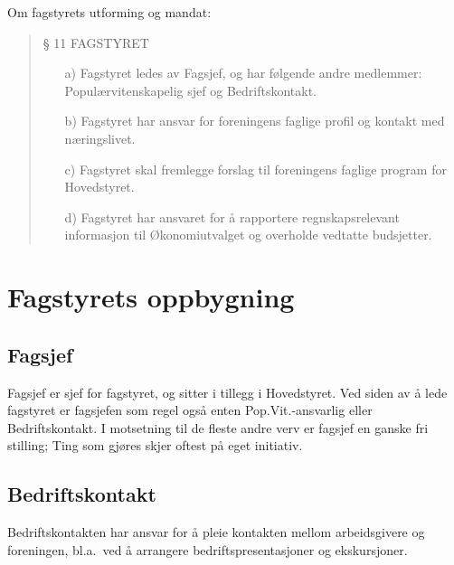 %
Om fagstyrets utforming og mandat:
\begin{quote}

    {\Large § 11 FAGSTYRET}
    
    \begin{itemize}
        \item[a)] Fagstyret ledes av Fagsjef, og har følgende andre medlemmer:
        Populærvitenskapelig sjef og Bedriftskontakt.
        
        \item[b)] Fagstyret har ansvar for foreningens faglige profil og
        kontakt med næringslivet.
        
        \item[c)] Fagstyret skal fremlegge forslag til foreningens faglige
        program for Hovedstyret.
        
        \item[d)] Fagstyret har ansvaret for å rapportere regnskapsrelevant
        informasjon til Økonomiutvalget og overholde vedtatte budsjetter.
    \end{itemize}

\end{quote}

\section{Fagstyrets oppbygning}
\subsection{Fagsjef}
Fagsjef er sjef for fagstyret, og sitter i tillegg i Hovedstyret.
Ved siden av å lede fagstyret er
fagsjefen som regel også enten Pop.Vit.-ansvarlig eller Bedriftskontakt.
I motsetning til de fleste andre verv er fagsjef en ganske fri stilling; Ting
som gjøres skjer oftest på eget initiativ.

\subsection{Bedriftskontakt}
Bedriftskontakten har ansvar for å pleie kontakten mellom arbeidsgivere og
foreningen, bl.a.~ved å arrangere bedriftspresentasjoner og ekskursjoner.

